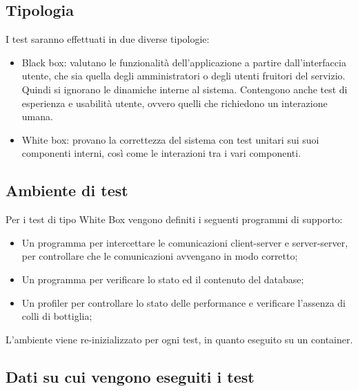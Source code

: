 \subsection*{Tipologia}
I test saranno effettuati in due diverse tipologie:
\begin{itemize}
    \item Black box: valutano le funzionalità dell'applicazione a partire dall'interfaccia utente, che
    sia quella degli amministratori o degli utenti fruitori del servizio. Quindi si ignorano le dinamiche
    interne al sistema. Contengono anche test di esperienza e usabilità utente, ovvero quelli che richiedono
    un interazione umana.
    \item White box: provano la correttezza del sistema con test unitari sui suoi componenti interni, 
    così come le interazioni tra i vari componenti.
\end{itemize}

\subsection*{Ambiente di test}
Per i test di tipo White Box vengono definiti i seguenti programmi di supporto:
\begin{itemize}
    \item Un programma per intercettare le comunicazioni client-server e server-server, per controllare che le
    comunicazioni avvengano in modo corretto;
    \item Un programma per verificare lo stato ed il contenuto del database;
    \item Un profiler per controllare lo stato delle performance e verificare l’assenza di colli di bottiglia;
\end{itemize}
L’ambiente viene re-inizializzato per ogni test, in quanto eseguito su un container.

\subsection*{Dati su cui vengono eseguiti i test}

